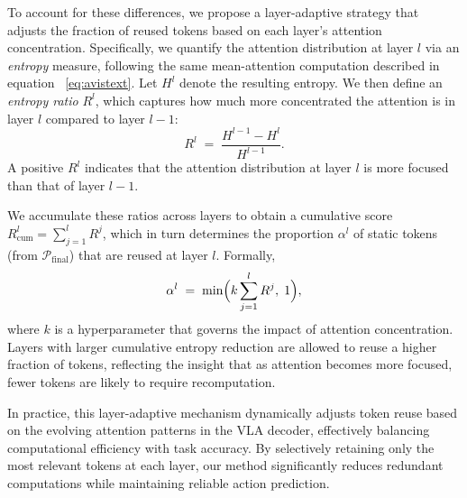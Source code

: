 To account for these differences, we propose a layer-adaptive strategy that adjusts the fraction of reused tokens based on each layer’s attention concentration. Specifically, we quantify the attention distribution at layer \(l\) via an \emph{entropy} measure, following the same mean-attention computation described in equation ~\ref{eq:avistext}. Let \(H^l\) denote the resulting entropy. We then define an \emph{entropy ratio} \(R^l\), which captures how much more concentrated the attention is in layer \(l\) compared to layer \(l-1\):
\begin{equation}
\label{eq:entropy_ratio}
R^l \;=\; \frac{H^{l-1} - H^l}{H^{l-1}}.
\end{equation}
A positive $R^l$ indicates that the attention distribution at layer $l$ is more focused than that of layer $l-1$. 

We accumulate these ratios across layers to obtain a cumulative score \(R_{\text{cum}}^l=\sum_{j=1}^{l} R^j\), which in turn determines the proportion \(\alpha^l\) of static tokens (from \(\mathcal{P}_{\mathrm{final}}\)) that are reused at layer \(l\). Formally,
\begin{equation}
\label{eq:reuse_ratio}
\alpha^l \;=\; \min\Bigl(k \sum_{j=1}^l R^j,\; 1\Bigr),
\end{equation}
where \(k\) is a hyperparameter that governs the impact of attention concentration. Layers with larger cumulative entropy reduction are allowed to reuse a higher fraction of tokens, reflecting the insight that as attention becomes more focused, fewer tokens are likely to require recomputation.

In practice, this layer-adaptive mechanism dynamically adjusts token reuse based on the evolving attention patterns in the VLA decoder, effectively balancing computational efficiency with task accuracy. By selectively retaining only the most relevant tokens at each layer, our method significantly reduces redundant computations while maintaining reliable action prediction. 


